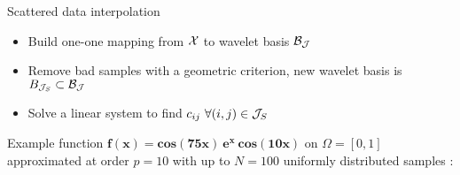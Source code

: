 \begin{frame}{Scattered data interpolation}
{                    \vskip 0.3cm
                    \begin{itemize}
                        \item<5->  Build one-one mapping from $\mathcal{X}$ to wavelet basis $\mathcal{B}_{\mathcal{J}}$
                        \item<6->  Remove bad samples with a geometric criterion, new wavelet basis is $B_{\mathcal{J}_S} \subset \mathcal{B}_{\mathcal{J}}$
                        \item<7->  Solve a linear system to find $c_{ij}\ \forall (i,j) \in \J_S$
                    \end{itemize}
                }

            \end{frame}

            \begin{frame}{Example function}
                $\mathbf{f(x) = cos(75x)\ e^x\ cos(10x)}$ on \alert{$\Omega = [0,1]$} approximated at order \alert{$p = 10$} with up to \alert{$N = 100$} uniformly distributed samples :


            \end{frame}

